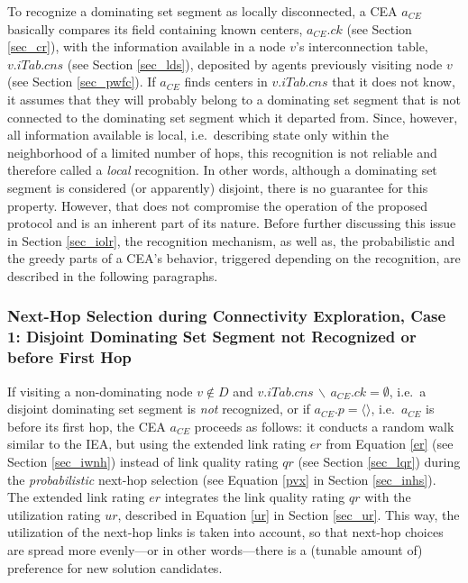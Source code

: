 To recognize a dominating set segment as locally disconnected, a CEA $a_{CE}$ basically compares its field containing known centers, $a_{CE}.ck$ (see Section \ref{sec_cr}), with the information available in a node $v$'s interconnection table, $v.iTab.cns$ (see Section \ref{sec_lds}), deposited by agents previously visiting node $v$ (see Section \ref{sec_pwfc}). If $a_{CE}$ finds centers in $v.iTab.cns$ that it does not know, it assumes that they will probably belong to a dominating set segment that is not connected to the dominating set segment which it departed from. Since, however, all information available is local, i.e.\ describing state only within the neighborhood of a limited number of hops, this recognition is not reliable and therefore called a \emph{local} recognition. In other words, although a dominating set segment is considered (or apparently) disjoint, there is no guarantee for this property. However, that does not compromise the operation of the proposed protocol and is an inherent part of its nature. Before further discussing this issue in Section \ref{sec_iolr}, the recognition mechanism, as well as, the probabilistic and the greedy  parts of a CEA's behavior, triggered depending on the recognition, are described in the following paragraphs.

\subsubsection{Next-Hop Selection during Connectivity Exploration, Case 1: Disjoint Dominating Set Segment not Recognized or before First Hop}\label{sec_nhsd} If visiting a non-dominating node $v \notin D$ and $v.iTab.cns \,\backslash\, a_{CE}.ck = \emptyset$, i.e.\ a disjoint dominating set segment is \emph{not} recognized, or if $a_{CE}.p=\langle \rangle$, i.e.\ $a_{CE}$ is before its first hop, the CEA $a_{CE}$ proceeds as follows: it conducts a random walk similar to the IEA, but using the extended link rating $er$ from Equation \ref{er} (see Section \ref{sec_iwnh}) instead of link quality rating $qr$ (see Section \ref{sec_lqr}) during the \emph{probabilistic} next-hop selection (see Equation \ref{pvx} in Section \ref{sec_inhs}). The extended link rating $er$ integrates the link quality rating $qr$ with the utilization rating $ur$, described in Equation \ref{ur} in Section \ref{sec_ur}. This way, the utilization of the next-hop links is taken into account, so that next-hop choices are spread more evenly---or in other words---there is a (tunable amount of) preference for new solution candidates. 

